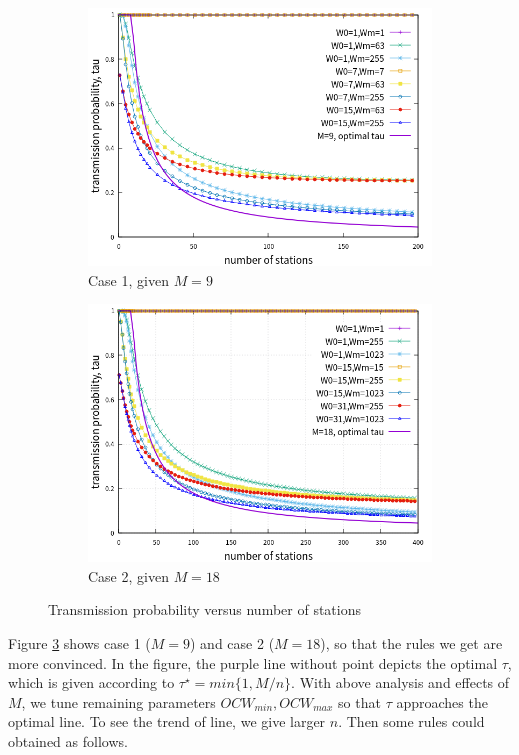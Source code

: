 \documentclass[journal]{IEEEtran}
\begin{document}
\begin{figure}[!t]
\centering
\begin{subfigure}{0.5\textwidth}
\includegraphics[scale=.54]{./figure/chp4/M9/n_tau_perf_M9_x200.png}
\caption{Case 1, given $M=9$}
\label{fig_tau_n_M9}
\end{subfigure}
\begin{subfigure}{0.5\textwidth}
\includegraphics[scale=.54]{./figure/chp4/M18/n_tau_perf_M18_x400.png}
\caption{Case 2, given $M=18$}
\label{fig_tau_n_M18}
\end{subfigure}
\caption{Transmission probability versus number of stations}
\label{fig_tau_n}
\end{figure}
Figure \ref{fig_tau_n} shows case 1 ($M=9$) and case 2 ($M=18$), so that the rules we get are more convinced.
In the figure, the purple line without point depicts the optimal $\tau$, which is given according to $\tau^\star = min\lbrace 1, M/n \rbrace$.
With above analysis and effects of $M$, we tune remaining parameters $OCW_{min}, OCW_{max}$ so that $\tau$ approaches the optimal line. 
To see the trend of line, we give larger $n$. Then some rules could obtained as follows.
\end{document}
